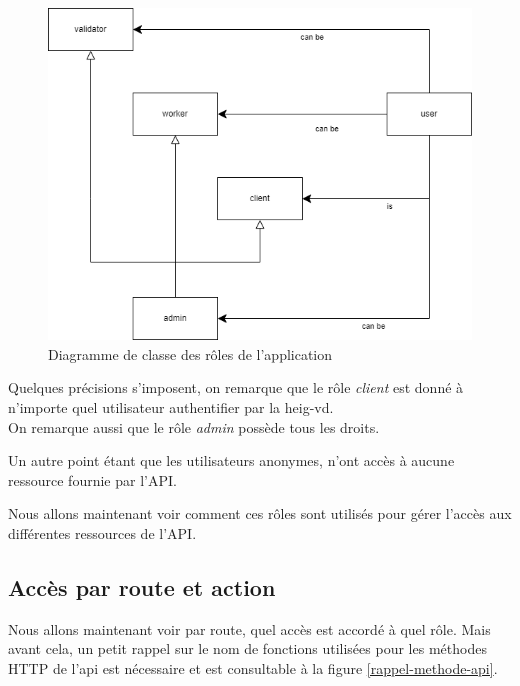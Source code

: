 \documentclass[
    iai, %
    il, %
]{heig-tb}
\begin{document}
\begin{center}
    \begin{figure}
        \includegraphics[width=\textwidth]{./assets/figures/roles-diagram.drawio.png}
        \caption{Diagramme de classe des rôles de l'application \label{roles-diagram.drawio}}
    \end{figure}
\end{center}

Quelques précisions s'imposent, on remarque que le rôle \emph{client} est donné à n'importe quel utilisateur authentifier par la \Gls{heig-vd}. \\
On remarque aussi que le rôle \emph{admin} possède tous les droits.

Un autre point étant que les utilisateurs anonymes, n'ont accès à aucune ressource fournie par l'API.

Nous allons maintenant voir comment ces rôles sont utilisés pour gérer l'accès aux différentes ressources de l'API.

\subsection{Accès par route et action}
Nous allons maintenant voir par route, quel accès est accordé à quel rôle.
Mais avant cela, un petit rappel sur le nom de fonctions utilisées pour les méthodes HTTP de l'\Gls{api} est nécessaire et est consultable à la figure \ref{rappel-methode-api}.
\end{document}
